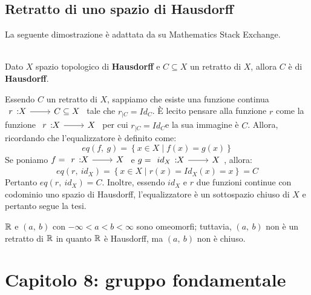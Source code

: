 \subsection{Retratto di uno spazio di Hausdorff}
La seguente dimostrazione è adattata da \cite{freakish:retract} su Mathematics Stack Exchange.
\begin{lemming}~{}\\
Dato $X$ spazio topologico di \textbf{Hausdorff} e $C\subseteq X$ un retratto di $X$, allora $C$ è di \textbf{Hausdorff}.
\end{lemming}
\begin{demonstration}
	Essendo $C$ un retratto di $X$, sappiamo che esiste una funzione continua $\funz{r}{X}{C\subseteq X}$ tale che $r_{\mid C}=Id_C$. È lecito pensare alla funzione $r$ come la funzione $\funz{r}{X}{X}$ per cui $r_{\mid C}=Id_C$e la sua immagine è $C$. Allora, ricordando che l'equalizzatore è definito come:
	\begin{equation*}
		eq\left(f,\ g\right)=\left\{x\in X\mid f\left(x\right)=g\left(x\right)\right\}
	\end{equation*}
	Se poniamo $f=\funz{r}{X}{X}$ e $g=\funz{id_X}{X}{X}$, allora:
	\begin{equation*}
		eq\left(r,\ id_X\right)=\left\{x\in X\mid r\left(x\right)=Id_X\left(x\right)=x\right\}=C
	\end{equation*}
	Pertanto $eq\left(r,\ id_X\right)=C$. Inoltre, essendo $id_X$ e $r$ due funzioni continue con codominio uno spazio di Hausdorff, l'equalizzatore è un sottospazio chiuso di $X$ e pertanto segue la tesi.
\end{demonstration}
\begin{examples}
	$\mathbb{R}$ e $\left(a,\ b\right)$ con $-\infty < a < b < \infty$ sono omeomorfi; tuttavia, $\left(a,\ b\right)$ non è un retratto di $\mathbb{R}$ in quanto $\mathbb{R}$ è Hausdorff, ma $\left(a,\ b\right)$ non è chiuso.
\end{examples}
\section{Capitolo 8: gruppo fondamentale}
